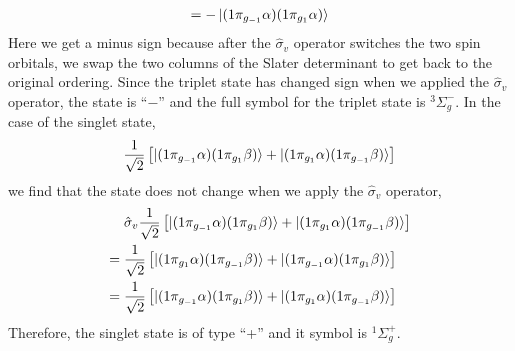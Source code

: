 \documentclass[../Main/chem532-notes.tex]{subfiles}
\begin{document}
\begin{example}
\begin{equation}
\begin{split}
= - \ket{(1\pi_{g_{-1}} \alpha) (1\pi_{g_{1}} \alpha)}
\end{split}
\end{equation}
Here we get a minus sign because after the $\hat{\sigma}_v$ operator switches the two spin orbitals, we swap the two columns of the Slater determinant to get back to the original ordering.
Since the triplet state has changed sign when we applied the $\hat{\sigma}_v$ operator, the state is ``$-$'' and the full symbol for the triplet state is $ {^3}\Sigma_g^{-}$. 
In the case of the singlet state,
\begin{equation}
\frac{1}{\sqrt{2}} \left[ \ket{(1\pi_{g_{-1}} \alpha) (1\pi_{g_{1}} \beta)} + \ket{(1\pi_{g_{1}} \alpha) (1\pi_{g_{-1}} \beta)} \right]
\end{equation}
we find that the state does not change when we apply the $\hat{\sigma}_v$ operator,
\begin{equation}
\begin{split}
&\; \hat{\sigma}_v \frac{1}{\sqrt{2}} \left[ \ket{(1\pi_{g_{-1}} \alpha) (1\pi_{g_{1}} \beta)} + \ket{(1\pi_{g_{1}} \alpha) (1\pi_{g_{-1}} \beta)} \right] \\
= & \; \frac{1}{\sqrt{2}} \left[ \ket{(1\pi_{g_{1}} \alpha) (1\pi_{g_{-1}} \beta)} + \ket{(1\pi_{g_{-1}} \alpha) (1\pi_{g_{1}} \beta)} \right] \\
= & \; \frac{1}{\sqrt{2}} \left[ \ket{(1\pi_{g_{-1}} \alpha) (1\pi_{g_{1}} \beta)} + \ket{(1\pi_{g_{1}} \alpha) (1\pi_{g_{-1}} \beta)} \right] \\
\end{split}
\end{equation}
Therefore, the singlet state is of type ``+'' and it symbol is $ {^1}\Sigma_g^{+}$.
\end{example}
\end{document}
